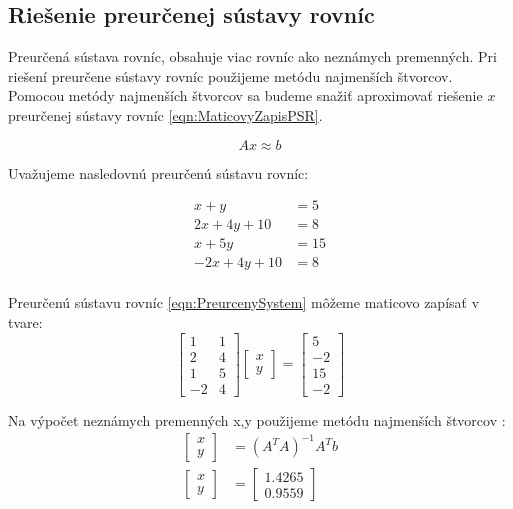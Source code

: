 \documentclass[../main.tex]{subfiles}
\begin{document}
	
\subsection{Riešenie preurčenej sústavy rovníc}

Preurčená sústava rovníc, obsahuje viac rovníc ako neznámych premenných. Pri riešení preurčene sústavy rovníc použijeme metódu najmenších štvorcov. Pomocou metódy najmenších štvorcov sa budeme snažiť aproximovať riešenie $x$ preurčenej sústavy rovníc \ref{eqn:MaticovyZapisPSR}.

\begin{equation}
	Ax \approx b
	\label{eqn:MaticovyZapisPSR}
\end{equation}

Uvažujeme nasledovnú preurčenú sústavu rovníc:

\begin{equation}
	\begin{split}
	 x+y  & = 5 \\
	 2x+4y+10 & = 8 \\
	 x+5y & = 15 \\
	 -2x+4y+10 & = 8 \\
	\end{split}
	\label{eqn:PreurcenySystem}
\end{equation}

Preurčenú sústavu rovníc \ref{eqn:PreurcenySystem} môžeme maticovo zapísať v tvare:
\begin{equation}
\begin{bmatrix} 1 & 1\\ 2 & 4 \\1 &5 \\-2& 4\end{bmatrix}\begin{bmatrix}x \\y \end{bmatrix} = \begin{bmatrix} 5 \\-2\\15\\-2 \end{bmatrix}
 \label{eqn:MaticovyZapisPiklad}
\end{equation}

Na výpočet neznámych premenných x,y použijeme metódu najmenších štvorcov :
\begin{equation}
	\begin{split}
	\begin{bmatrix}x \\y \end{bmatrix} &=  (A^TA)^{-1}A^Tb\\
	\begin{bmatrix}x \\y \end{bmatrix} &=  \begin{bmatrix} 1.4265 \\0.9559\end{bmatrix}
	\end{split}
	\label{eqn:MNS}
\end{equation}
\end{document}
